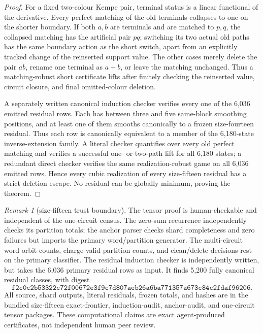 \documentclass[11pt]{article}
\theoremstyle{definition}
\theoremstyle{remark}
\newtheorem{remark}[theorem]{Remark}
\begin{document}
\begin{proof}
For a fixed two-colour Kempe pair, terminal status is a linear functional
of the derivative.  Every perfect matching of the old terminals collapses
to one on the shorter boundary.  If both \(a,b\) are terminals and are
matched to \(p,q\), the collapsed matching has the artificial pair
\(pq\); switching its two actual old paths has the same boundary action
as the short switch, apart from an explicitly tracked change of the
reinserted support value.  The other cases merely delete the pair
\(ab\), rename one terminal as \(a+b\), or leave the matching unchanged.
Thus a matching-robust short certificate lifts after finitely checking
the reinserted value, circuit closure, and final omitted-colour deletion.

A separately written canonical induction checker verifies every one of
the 6,036 emitted residual rows.  Each has between three and five
same-block smoothing positions, and at least one of them smooths
canonically to a frozen size-fourteen residual.  Thus each row is
canonically equivalent to a member of the 6,180-state inverse-extension
family.  A literal checker quantifies over every old perfect matching and
verifies a successful one- or two-path lift for all 6,180 states; a
redundant direct checker verifies the same realization-robust game on all
6,036 emitted rows.  Hence every cubic realization of every size-fifteen
residual has a strict deletion escape.  No residual can be globally
minimum, proving the theorem.
\end{proof}

\begin{remark}[size-fifteen trust boundary]
The tensor proof is human-checkable and independent of the one-circuit
census.  The zero-sum recurrence independently checks its partition
totals; the anchor parser checks shard completeness and zero failures but
imports the primary word/partition generator.  The multi-circuit
word-orbit counts, charge-valid partition counts, and clean/delete
decisions rest on the primary classifier.  The residual induction checker
is independently written, but takes the 6,036 primary residual rows as
input.  It finds 5,200 fully canonical residual classes, with digest
\[
\texttt{f2c0c2b53322c72f00672e3f9c7d807aeb26a6ba771357a673c84c2fdaf96206}.
\]
All source, shard outputs, literal residuals, frozen totals, and hashes
are in the bundled size-fifteen exact-frontier, induction-audit,
anchor-audit, and one-circuit tensor packages.  These computational claims
are exact agent-produced certificates, not independent human peer review.
\end{remark}
\end{document}
